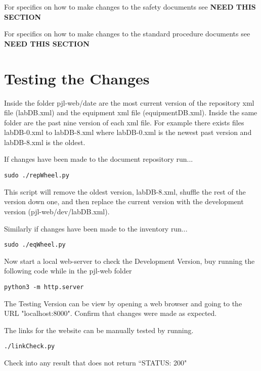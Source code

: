 \documentclass[justified]{LabArx3_5_1}
\begin{document}
For specifics on how to make changes to the safety documents see {\bf NEED THIS SECTION}

For specifics on how to make changes to the standard procedure documents see {\bf NEED THIS SECTION}

\section{Testing the Changes}\label{sec:testingChanges}

Inside the folder pjl-web/date are the most current version of the repository xml file (labDB.xml) and the equipment xml file (equipmentDB.xml). Inside the same folder are the past nine version of each xml file. For example there exists files labDB-0.xml to labDB-8.xml where labDB-0.xml is the newest past version and labDB-8.xml is the oldest. 

If changes have been made to the document repository run...
\begin{lstlisting}[backgroundcolor = \color{light-gray}]
sudo ./repWheel.py
\end{lstlisting}

This script will remove the oldest version, labDB-8.xml, shuffle the rest of the version down one, and then replace the current version with the development version (pjl-web/dev/labDB.xml). 

Similarly if changes have been made to the inventory run...
\begin{lstlisting}[backgroundcolor = \color{light-gray}]
sudo ./eqWheel.py
\end{lstlisting}

Now start a local web-server to check the Development Version, buy running the following code while in the pjl-web folder

\begin{lstlisting}[backgroundcolor = \color{light-gray}]
python3 -m http.server
\end{lstlisting}

The Testing Version can be view by opening a web browser and going to the URL "localhost:8000". Confirm that changes were made as expected.

The links for the website can be manually tested by running.
\begin{lstlisting}[backgroundcolor = \color{light-gray}]
./linkCheck.py
\end{lstlisting}

Check into any result that does not return ``STATUS: 200"
\end{document}
